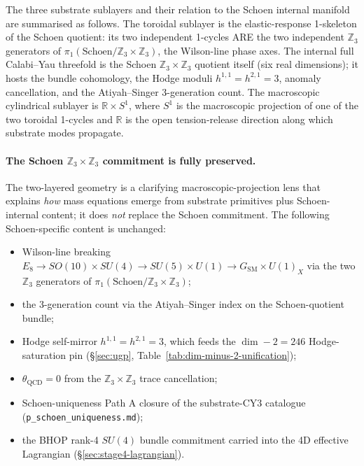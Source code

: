 ﻿\documentclass[reprint,amsmath,amssymb,aps,prd,longbibliography,floatfix]{revtex4-2}
\begin{document}
The three substrate sublayers and their relation to the Schoen
internal manifold are summarised as follows. The toroidal sublayer
is the elastic-response 1-skeleton of the Schoen quotient: its two
independent 1-cycles ARE the two independent $\mathbb{Z}_3$
generators of $\pi_1(\mathrm{Schoen}/\mathbb{Z}_3 \times
\mathbb{Z}_3)$, the Wilson-line phase axes. The internal full
Calabi--Yau threefold is the Schoen $\mathbb{Z}_3 \times
\mathbb{Z}_3$ quotient itself (six real dimensions); it hosts the
bundle cohomology, the Hodge moduli $h^{1,1} = h^{2,1} = 3$,
anomaly cancellation, and the Atiyah--Singer 3-generation count.
The macroscopic cylindrical sublayer is $\mathbb{R} \times S^1$,
where $S^1$ is the macroscopic projection of one of the two
toroidal 1-cycles and $\mathbb{R}$ is the open tension-release
direction along which substrate modes propagate.

\paragraph{The Schoen
$\mathbb{Z}_3 \times \mathbb{Z}_3$ commitment is fully preserved.}
The two-layered geometry is a clarifying macroscopic-projection
lens that explains \emph{how} mass equations emerge from
substrate primitives plus Schoen-internal content; it does
\emph{not} replace the Schoen commitment. The following
Schoen-specific content is unchanged:
\begin{itemize}
\item Wilson-line breaking $E_8 \to SO(10) \times SU(4) \to
SU(5) \times U(1) \to G_\mathrm{SM} \times U(1)_X$ via the two
$\mathbb{Z}_3$ generators of $\pi_1(\mathrm{Schoen}/
\mathbb{Z}_3 \times \mathbb{Z}_3)$;
\item the 3-generation count via the Atiyah--Singer index on the
Schoen-quotient bundle;
\item Hodge self-mirror $h^{1,1} = h^{2,1} = 3$, which feeds the
$\dim - 2 = 246$ Hodge-saturation pin
(\S\ref{sec:ugp}, Table~\ref{tab:dim-minus-2-unification});
\item $\theta_\mathrm{QCD} = 0$ from the
$\mathbb{Z}_3 \times \mathbb{Z}_3$ trace cancellation;
\item Schoen-uniqueness Path A closure of the substrate-CY3
catalogue (\texttt{p\_schoen\_uniqueness.md});
\item the BHOP rank-4 $SU(4)$ bundle commitment carried into the
4D effective Lagrangian
(\S\ref{sec:stage4-lagrangian}).
\end{itemize}
\end{document}
